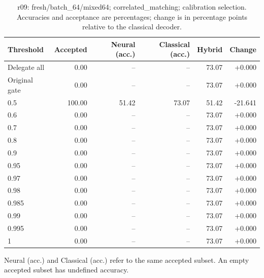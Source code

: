\begin{table}[htbp]
\centering\small
\setlength{\tabcolsep}{3pt}
\caption{r09: fresh/batch\_64/mixed64; correlated\_matching; calibration selection. Accuracies and acceptance are percentages; change is in percentage points relative to the classical decoder.}
\begin{tabular}{lrrrrr}
\toprule
Threshold & Accepted & Neural (acc.) & Classical (acc.) & Hybrid & Change \\
\midrule
Delegate all & 0.00 & -- & -- & 73.07 & +0.000 \\
Original gate & 0.00 & -- & -- & 73.07 & +0.000 \\
0.5 & 100.00 & 51.42 & 73.07 & 51.42 & -21.641 \\
0.6 & 0.00 & -- & -- & 73.07 & +0.000 \\
0.7 & 0.00 & -- & -- & 73.07 & +0.000 \\
0.8 & 0.00 & -- & -- & 73.07 & +0.000 \\
0.9 & 0.00 & -- & -- & 73.07 & +0.000 \\
0.95 & 0.00 & -- & -- & 73.07 & +0.000 \\
0.97 & 0.00 & -- & -- & 73.07 & +0.000 \\
0.98 & 0.00 & -- & -- & 73.07 & +0.000 \\
0.985 & 0.00 & -- & -- & 73.07 & +0.000 \\
0.99 & 0.00 & -- & -- & 73.07 & +0.000 \\
0.995 & 0.00 & -- & -- & 73.07 & +0.000 \\
1 & 0.00 & -- & -- & 73.07 & +0.000 \\
\bottomrule
\end{tabular}
\par\smallskip\footnotesize Neural (acc.) and Classical (acc.) refer to the same accepted subset. An empty accepted subset has undefined accuracy.
\end{table}
